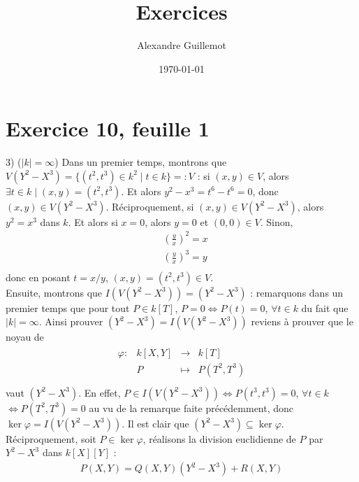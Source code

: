 \documentclass[11pt]{article}
\begin{document}
\title{Exercices}
\date{\today}
\author{Alexandre Guillemot}
\maketitle

\section*{Exercice 10, feuille 1}
    \begin{question}{3)} ($|k| = \infty$)
        Dans un premier temps, montrons que $V(Y^2 - X^3) = \{(t^2, t^3) \in k^2 \mid t \in k\} =: V$ : si $(x,y) \in V$, alors $\exists t \in k \mid (x,y) = (t^2, t^3)$. Et alors $y^2 - x^3 = t^6 - t^6 = 0$, donc $(x,y) \in V(Y^2 - X^3)$. Réciproquement, si $(x,y) \in V(Y^2 - X^3)$, alors $y^2 = x^3$ dans $k$. Et alors si $x = 0$, alors $y = 0$ et $(0,0) \in V$. Sinon,
        \begin{align*}
            &\left(\frac{y}{x}\right)^2 = x \\
            &\left(\frac{y}{x}\right)^3 = y \\
        \end{align*}
        donc en posant $t = x/y$, $(x,y) = (t^2, t^3) \in V$. \\
        Ensuite, montrons que $I(V(Y^2 - X^3)) = (Y^2 - X^3)$ : remarquons dans un premier temps que pour tout $P \in k[T]$, $P = 0 \iff P(t) = 0$, $\forall t \in k$ du fait que $|k| = \infty$. Ainsi prouver $(Y^2 - X^3) = I(V(Y^2 - X^3))$ reviens à prouver que le noyau de
        \begin{align*}
            \begin{array}{cccc}
                \varphi : & k[X,Y] & \to & k[T] \\
                & P & \mapsto & P(T^2,T^3) \\
            \end{array}
        \end{align*}
        vaut $(Y^2 - X^3)$. En effet, $P \in I(V(Y^2 - X^3)) \iff P(t^3, t^3) = 0$, $\forall t \in k$ $\iff P(T^2, T^3) = 0$ au vu de la remarque faite précédemment, donc $\ker \varphi = I(V(Y^2 - X^3))$. Il est clair que $(Y^2 - X^3) \subseteq \ker \varphi$. Réciproquement, soit $P \in \ker \varphi$, réalisons la division euclidienne de $P$ par $Y^2 - X^3$ dans $k[X][Y]$ :
        \begin{align*}
            P(X,Y) = Q(X,Y)(Y^2 - X^3) + R(X,Y)
        \end{align*}

\end{question}
\end{document}
